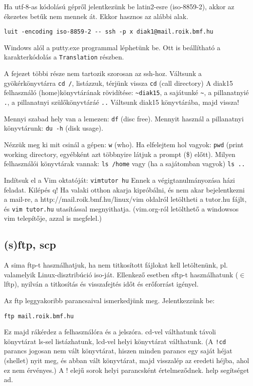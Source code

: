 \documentclass[a4paper]{article}
\newcommand{\alapcim}{http://mail.roik.bmf.hu/linux}
\newcommand{\code}{\texttt}
\begin{document}
Ha utf-8-as kódolású gépről jelentkezünk be latin2-esre (iso-8859-2),
akkor az ékezetes betűk nem mennek át. Ekkor hasznos az alábbi alak.
\begin{Verbatim}
luit -encoding iso-8859-2 -- ssh -p x diak1@mail.roik.bmf.hu
\end{Verbatim}
Windows alól a putty.exe programmal léphetünk be. Ott is beállítható a
karakterkódolás a \texttt{Translation} részben.

A fejezet többi része nem tartozik szorosan az ssh-hoz.
Váltsunk a gyökérkönyvtárra \code{cd /}, listázzuk, térjünk vissza \code{cd} 
(call directory) A diak15 felhasználó (home)könyvtárának rövidítése:
\code{\~{}diak15}, a sajátunké \code{\~{}}, a pillanatnyié \code{.}, a
pillanatnyi szülőkönyvtáráé \code{..} Váltsunk diak15 könyvtárába, majd
vissza!

Mennyi szabad hely van a lemezen: \code{df} (disc free). Mennyit használ
a pillanatnyi könyvtárunk: \code{du -h} (disk usage).

Nézzük meg ki mit csinál a gépen: \code{w} (who). Ha elfelejtem hol vagyok:
\code{pwd} (print working directory, egyébként azt többnyire látjuk a
prompt (\$) előtt). Milyen felhasználói könyvtárak
vannak: \code{ls /home} vagy (ha a sajátomban vagyok) \code{ls ..}

Indítsuk el a Vim oktatóját: \code{vimtutor hu}  Ennek a
végigtanulmányozása házi feladat. Kilépés q!
Ha valaki otthon akarja kipróbálni, és nem akar bejelentkezni a mail-re,
a \alapcim{}/vim oldalról letöltheti a tutor.hu
fájlt, és \code{vim tutor.hu} utasítással megnyithatja. (vim.org-ról
letölthető a windowsos vim telepítője, azzal is megfelel.)

\subsection{(s)ftp, scp}
A sima ftp-t használhatjuk, ha nem titkosított fájlokat kell
letöltenünk, pl. valamelyik Linux-disztribúció  iso-ját. Ellenkező
esetben sftp-t használhatunk ($\in$ lftp), nyilván a titkosítás és
visszafejtés időt és erőforrást igényel.

Az ftp leggyakoribb parancsaival ismerkedjünk meg. Jelentkezzünk be:
\begin{Verbatim}
ftp mail.roik.bmf.hu
\end{Verbatim}
Ez majd rákérdez a felhasználóra és a jelszóra. cd-vel válthatunk
távoli könyvtárat ls-sel listázhatunk, lcd-vel helyi könyvtárat
válthatunk. (A \code{!cd} parancs jogosan nem vált könyvtárat, hiszen
minden parancs egy saját héjat (shellet) nyit meg, és abban vált
könyvtárat, majd visszalép az eredeti héjba, ahol ez nem érvényes.) A !
elejű sorok helyi parancsként értelmeződnek. help segítséget ad.
\end{document}
